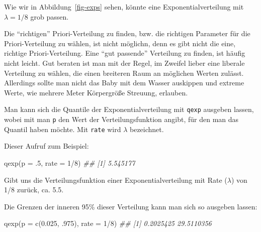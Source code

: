 \documentclass[
  a4paper,
  DIV=11]{scrreprt}
\newenvironment{Shaded}{\begin{snugshade}}{\end{snugshade}}
\newcommand{\AttributeTok}[1]{\textcolor[rgb]{0.40,0.45,0.13}{#1}}
\newcommand{\DecValTok}[1]{\textcolor[rgb]{0.68,0.00,0.00}{#1}}
\newcommand{\DocumentationTok}[1]{\textcolor[rgb]{0.37,0.37,0.37}{\textit{#1}}}
\newcommand{\FloatTok}[1]{\textcolor[rgb]{0.68,0.00,0.00}{#1}}
\newcommand{\FunctionTok}[1]{\textcolor[rgb]{0.28,0.35,0.67}{#1}}
\newcommand{\NormalTok}[1]{\textcolor[rgb]{0.00,0.23,0.31}{#1}}
\newcommand{\SpecialCharTok}[1]{\textcolor[rgb]{0.37,0.37,0.37}{#1}}
\theoremstyle{definition}
\theoremstyle{remark}
\begin{document}
Wie wir in Abbildung~\ref{fig-exps} sehen, könnte eine
Exponentialverteilung mit \(\lambda=1/8\) grob passen.

\begin{tcolorbox}[enhanced jigsaw, title=\textcolor{quarto-callout-note-color}{\faInfo}\hspace{0.5em}{Hinweis}, bottomtitle=1mm, bottomrule=.15mm, titlerule=0mm, colbacktitle=quarto-callout-note-color!10!white, colframe=quarto-callout-note-color-frame, leftrule=.75mm, left=2mm, toprule=.15mm, colback=white, arc=.35mm, breakable, toptitle=1mm, opacityback=0, rightrule=.15mm, coltitle=black, opacitybacktitle=0.6]

Die ``richtigen'' Priori-Verteilung zu finden, bzw. die richtigen
Parameter für die Priori-Verteilung zu wählen, ist nicht möglichn, denn
es gibt nicht die eine, richtige Priori-Verteilung. Eine ``gut
passende'' Verteilung zu finden, ist häufig nicht leicht. Gut beraten
ist man mit der Regel, im Zweifel lieber eine liberale Verteilung zu
wählen, die einen breiteren Raum an möglichen Werten zulässt. Allerdings
sollte man nicht das Baby mit dem Wasser auskippen und extreme Werte,
wie mehrere Meter Körpergröße Streuung, erlauben.

\end{tcolorbox}

Man kann sich die Quantile der Exponentialverteilung mit \texttt{qexp}
ausgeben lassen, wobei mit man \texttt{p} den Wert der
Verteilungsfunktion angibt, für den man das Quantil haben möchte. Mit
\texttt{rate} wird \(\lambda\) bezeichnet.

Dieser Aufruf zum Beispiel:

\begin{Shaded}
\begin{Highlighting}[]
\FunctionTok{qexp}\NormalTok{(}\AttributeTok{p =}\NormalTok{ .}\DecValTok{5}\NormalTok{, }\AttributeTok{rate =} \DecValTok{1}\SpecialCharTok{/}\DecValTok{8}\NormalTok{)}
\DocumentationTok{\#\# [1] 5.545177}
\end{Highlighting}
\end{Shaded}

Gibt uns die Verteilungsfunktion einer Exponentialverteilung mit Rate
(\(\lambda\)) von 1/8 zurück, ca. 5.5.

Die Grenzen der inneren 95\% dieser Verteilung kann man sich so ausgeben
lassen:

\begin{Shaded}
\begin{Highlighting}[]
\FunctionTok{qexp}\NormalTok{(}\AttributeTok{p =} \FunctionTok{c}\NormalTok{(}\FloatTok{0.025}\NormalTok{, .}\DecValTok{975}\NormalTok{), }\AttributeTok{rate =} \DecValTok{1}\SpecialCharTok{/}\DecValTok{8}\NormalTok{)}
\DocumentationTok{\#\# [1]  0.2025425 29.5110356}
\end{Highlighting}
\end{Shaded}
\end{document}

